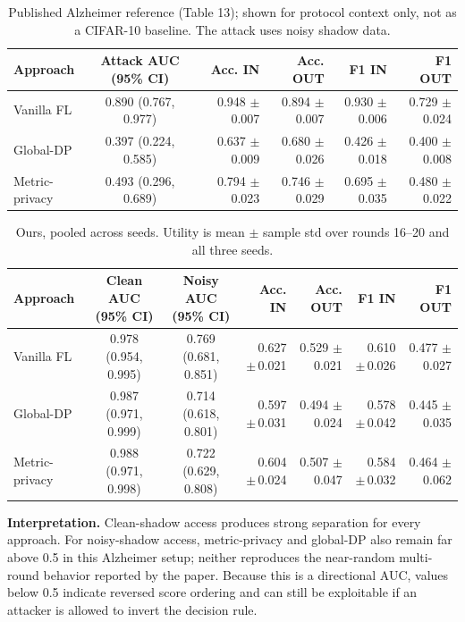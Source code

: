 \documentclass[10pt]{article}
\begin{document}
\begin{table}[h]
\centering
\caption{Published Alzheimer reference (Table 13); shown for protocol context only, not as a CIFAR-10 baseline. The attack uses noisy shadow data.}
\begin{tabular}{lccrrrr}
\toprule
Approach & Attack AUC (95\% CI) & & Acc. IN & Acc. OUT & F1 IN & F1 OUT \\
\midrule
Vanilla FL & 0.890 (0.767, 0.977) & & 0.948 $\pm$ 0.007 & 0.894 $\pm$ 0.007 & 0.930 $\pm$ 0.006 & 0.729 $\pm$ 0.024 \\
Global-DP & 0.397 (0.224, 0.585) & & 0.637 $\pm$ 0.009 & 0.680 $\pm$ 0.026 & 0.426 $\pm$ 0.018 & 0.400 $\pm$ 0.008 \\
Metric-privacy & 0.493 (0.296, 0.689) & & 0.794 $\pm$ 0.023 & 0.746 $\pm$ 0.029 & 0.695 $\pm$ 0.035 & 0.480 $\pm$ 0.022 \\
\bottomrule
\end{tabular}
\end{table}

\begin{table}[h]
\centering
\caption{Ours, pooled across seeds. Utility is mean $\pm$ sample std over rounds 16--20 and all three seeds.}
\begin{tabular}{lccrrrr}
\toprule
Approach & Clean AUC (95\% CI) & Noisy AUC (95\% CI) & Acc. IN & Acc. OUT & F1 IN & F1 OUT \\
\midrule
Vanilla FL & 0.978 (0.954, 0.995) & 0.769 (0.681, 0.851) & 0.627 {\scriptsize$\pm$\,0.021} & 0.529 {\scriptsize$\pm$\,0.021} & 0.610 {\scriptsize$\pm$\,0.026} & 0.477 {\scriptsize$\pm$\,0.027} \\
Global-DP & 0.987 (0.971, 0.999) & 0.714 (0.618, 0.801) & 0.597 {\scriptsize$\pm$\,0.031} & 0.494 {\scriptsize$\pm$\,0.024} & 0.578 {\scriptsize$\pm$\,0.042} & 0.445 {\scriptsize$\pm$\,0.035} \\
Metric-privacy & 0.988 (0.971, 0.998) & 0.722 (0.629, 0.808) & 0.604 {\scriptsize$\pm$\,0.024} & 0.507 {\scriptsize$\pm$\,0.047} & 0.584 {\scriptsize$\pm$\,0.032} & 0.464 {\scriptsize$\pm$\,0.062} \\
\bottomrule
\end{tabular}
\end{table}

\textbf{Interpretation.} Clean-shadow access produces strong separation for every approach.
For noisy-shadow access, metric-privacy and global-DP also remain far above 0.5 in this Alzheimer setup;
neither reproduces the near-random multi-round behavior reported by the paper. Because this is a directional
AUC, values below 0.5 indicate reversed score ordering and can still be exploitable if an attacker is allowed
to invert the decision rule.
\end{document}
